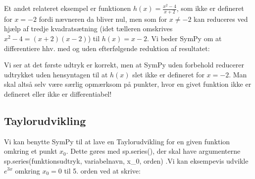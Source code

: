\documentclass[letterpaper,10pt,english]{jupyterBook}
\begin{document}
Et andet relateret eksempel er funktionen \(h(x) = \frac{x^2-4}{x+2}\), som ikke er defineret for \(x=-2\) fordi nævneren da bliver nul, men som for \(x\neq-2\) kan reduceres ved hjælp af tredje kvadratsætning (idet tælleren omskrives \(x^2-4 = (x+2)(x-2)\)) til \(h(x) = x-2\). Vi beder SymPy om at differentiere hhv. med og uden efterfølgende reduktion af resultatet:

\begin{sphinxVerbatim}[commandchars=\\\{\}]
    
    
\end{sphinxVerbatim}

\noindent{}

\noindent{}

Vi ser at det første udtryk er korrekt, men at SymPy uden forbehold reducerer udtrykket uden hensyntagen til at \(h(x)\) slet ikke er defineret for \(x=-2\). Man skal altså selv være særlig opmærksom på punkter, hvor en givet funktion ikke er defineret eller ikke er differentiabel!


\subsection{Taylorudvikling}
\label{\detokenize{notebooks/sympy/Notebook4:taylorudvikling}}
Vi kan benytte SymPy til at lave en Taylorudvikling for en given funktion omkring et punkt \(x_0\). Dette gøres med sp.series(), der skal have argumenterne sp.series(funktionsudtryk, variabelnavn, x\_0, orden)  .Vi kan eksempevis udvikle \(e^{3x}\) omkring \(x_0=0\) til 5. orden ved at skrive:

\begin{sphinxVerbatim}[commandchars=\\\{\}]
                      
      
                   
\end{sphinxVerbatim}
\end{document}
